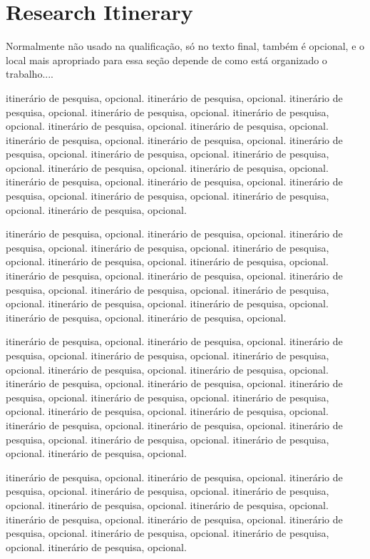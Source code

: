 
\chapter*{Research Itinerary}

Normalmente não usado na qualificação, só no texto final, também é opcional, e o local mais apropriado para essa seção depende de como está organizado o trabalho....

itinerário de pesquisa, opcional. itinerário de pesquisa, opcional. itinerário de pesquisa, opcional. itinerário de pesquisa, opcional. itinerário de pesquisa, opcional. itinerário de pesquisa, opcional. itinerário de pesquisa, opcional. itinerário de pesquisa, opcional. itinerário de pesquisa, opcional. itinerário de pesquisa, opcional. itinerário de pesquisa, opcional. itinerário de pesquisa, opcional. itinerário de pesquisa, opcional. itinerário de pesquisa, opcional. itinerário de pesquisa, opcional. itinerário de pesquisa, opcional. itinerário de pesquisa, opcional. itinerário de pesquisa, opcional. itinerário de pesquisa, opcional. itinerário de pesquisa, opcional. 


itinerário de pesquisa, opcional. itinerário de pesquisa, opcional. itinerário de pesquisa, opcional. itinerário de pesquisa, opcional. itinerário de pesquisa, opcional. itinerário de pesquisa, opcional. itinerário de pesquisa, opcional. itinerário de pesquisa, opcional. itinerário de pesquisa, opcional. itinerário de pesquisa, opcional. itinerário de pesquisa, opcional. itinerário de pesquisa, opcional. itinerário de pesquisa, opcional. itinerário de pesquisa, opcional. itinerário de pesquisa, opcional. itinerário de pesquisa, opcional. 

itinerário de pesquisa, opcional. itinerário de pesquisa, opcional. itinerário de pesquisa, opcional. itinerário de pesquisa, opcional. itinerário de pesquisa, opcional. itinerário de pesquisa, opcional. itinerário de pesquisa, opcional. itinerário de pesquisa, opcional. itinerário de pesquisa, opcional. itinerário de pesquisa, opcional. itinerário de pesquisa, opcional. itinerário de pesquisa, opcional. itinerário de pesquisa, opcional. itinerário de pesquisa, opcional. itinerário de pesquisa, opcional. itinerário de pesquisa, opcional. itinerário de pesquisa, opcional. itinerário de pesquisa, opcional. itinerário de pesquisa, opcional. itinerário de pesquisa, opcional. 

itinerário de pesquisa, opcional. itinerário de pesquisa, opcional. itinerário de pesquisa, opcional. itinerário de pesquisa, opcional. itinerário de pesquisa, opcional. itinerário de pesquisa, opcional. itinerário de pesquisa, opcional. itinerário de pesquisa, opcional. itinerário de pesquisa, opcional. itinerário de pesquisa, opcional. itinerário de pesquisa, opcional. itinerário de pesquisa, opcional. itinerário de pesquisa, opcional. 

\newpage